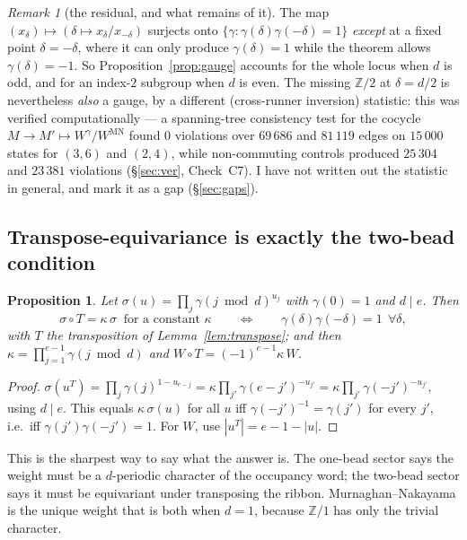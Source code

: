 \documentclass[11pt]{article}
\newtheorem{proposition}[theorem]{Proposition}
\theoremstyle{definition}
\theoremstyle{remark}
\newtheorem{remark}[theorem]{Remark}
\newcommand{\Z}{\mathbb{Z}}
\begin{document}
\begin{remark}[the residual, and what remains of it]\label{rem:residual}
The map $(x_\delta)\mapsto(\delta\mapsto x_\delta/x_{-\delta})$ surjects onto
$\{\gamma:\gamma(\delta)\gamma(-\delta)=1\}$ \emph{except} at a fixed point
$\delta=-\delta$, where it can only produce $\gamma(\delta)=1$ while the theorem allows
$\gamma(\delta)=-1$.  So Proposition~\ref{prop:gauge} accounts for the whole locus when
$d$ is odd, and for an index-$2$ subgroup when $d$ is even.  The missing
$\Z/2$ at $\delta=d/2$ is nevertheless \emph{also} a gauge, by a different
(cross-runner inversion) statistic: this was verified computationally --- a spanning-tree
consistency test for the cocycle $M\to M'\mapsto W^{\gamma}/W^{\mathrm{MN}}$ found $0$
violations over $69\,686$ and $81\,119$ edges on $15\,000$ states for $(3,6)$ and
$(2,4)$, while non-commuting controls produced $25\,304$ and $23\,381$ violations
(\S\ref{sec:ver}, Check~C7).  I have not written out the statistic in general, and mark
it as a gap (\S\ref{sec:gaps}).
\end{remark}

\subsection{Transpose-equivariance is exactly the two-bead condition}

\begin{proposition}\label{prop:transp}
Let $\sigma(u)=\prod_j\gamma(j\bmod d)^{u_j}$ with $\gamma(0)=1$ and $d\mid e$.  Then
\[
   \sigma\circ T=\kappa\,\sigma\ \text{ for a constant }\kappa
   \qquad\Longleftrightarrow\qquad
   \gamma(\delta)\gamma(-\delta)=1\ \ \forall\delta,
\]
with $T$ the transposition of Lemma~\ref{lem:transpose}; and then
$\kappa=\prod_{j=1}^{e-1}\gamma(j\bmod d)$ and $W\circ T=(-1)^{e-1}\kappa\,W$.
\end{proposition}

\begin{proof}
$\sigma(u^{T})=\prod_j\gamma(j)^{1-u_{e-j}}
=\kappa\prod_{j'}\gamma(e-j')^{-u_{j'}}=\kappa\prod_{j'}\gamma(-j')^{-u_{j'}}$, using
$d\mid e$.  This equals $\kappa\,\sigma(u)$ for all $u$ iff
$\gamma(-j')^{-1}=\gamma(j')$ for every $j'$, i.e.\ iff
$\gamma(j')\gamma(-j')=1$.  For $W$, use $|u^{T}|=e-1-|u|$.
\end{proof}

This is the sharpest way to say what the answer is.  The one-bead sector says the weight
must be a $d$-periodic character of the occupancy word; the two-bead sector says it must
be equivariant under transposing the ribbon.  Murnaghan--Nakayama is the unique weight
that is both when $d=1$, because $\Z/1$ has only the trivial character.
\end{document}
